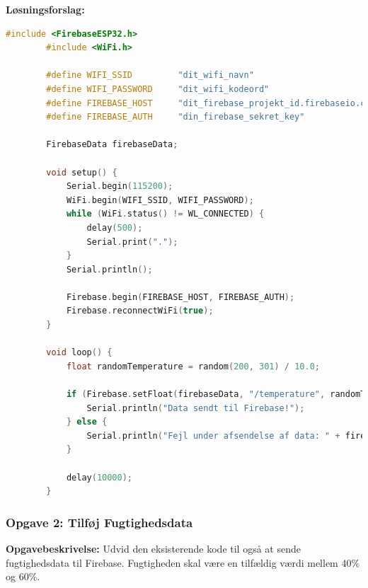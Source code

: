 \documentclass[12pt,a4paper]{book}
\begin{document}
	\textbf{Løsningsforslag:}
	\begin{lstlisting}[language=C++]
		#include <FirebaseESP32.h>
		#include <WiFi.h>
		
		#define WIFI_SSID         "dit_wifi_navn"
		#define WIFI_PASSWORD     "dit_wifi_kodeord"
		#define FIREBASE_HOST     "dit_firebase_projekt_id.firebaseio.com"
		#define FIREBASE_AUTH     "din_firebase_sekret_key"
		
		FirebaseData firebaseData;
		
		void setup() {
			Serial.begin(115200);
			WiFi.begin(WIFI_SSID, WIFI_PASSWORD);
			while (WiFi.status() != WL_CONNECTED) {
				delay(500);
				Serial.print(".");
			}
			Serial.println();
			
			Firebase.begin(FIREBASE_HOST, FIREBASE_AUTH);
			Firebase.reconnectWiFi(true);
		}
		
		void loop() {
			float randomTemperature = random(200, 301) / 10.0;
			
			if (Firebase.setFloat(firebaseData, "/temperature", randomTemperature)) {
				Serial.println("Data sendt til Firebase!");
			} else {
				Serial.println("Fejl under afsendelse af data: " + firebaseData.errorReason());
			}
			
			delay(10000);
		}
	\end{lstlisting}           
	
	\subsubsection*{Opgave 2: Tilføj Fugtighedsdata}
	
	\textbf{Opgavebeskrivelse:} Udvid den eksisterende kode til også at sende fugtighedsdata til Firebase. Fugtigheden skal være en tilfældig værdi mellem 40\% og 60\%.
	
\end{document}
